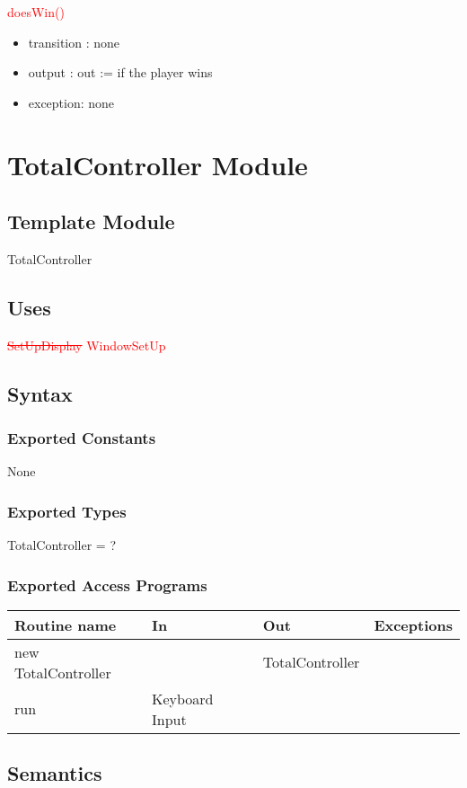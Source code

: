 \documentclass[12pt]{article}
\begin{document}
\noindent \textcolor{red}{doesWin()}
\begin{itemize}
\item transition : none
\item output : out := if the player wins
\item exception: none
\end{itemize}
\newpage

\section{TotalController Module}

\subsection*{Template Module}
TotalController

\subsection*{Uses}
\textcolor{red}{\st{SetUpDisplay} WindowSetUp}

\subsection*{Syntax}
\subsubsection*{Exported Constants}
None
\subsubsection*{Exported Types}
TotalController = ?
\subsubsection*{Exported Access Programs}
\begin{tabular}{| l | l | l | p{5cm} |}
\hline
\textbf{Routine name} & \textbf{In} & \textbf{Out} & \textbf{Exceptions}\\
\hline
new TotalController &  & TotalController & \\
\hline
run & Keyboard Input &  & \\
\hline
\end{tabular}

\subsection*{Semantics}
\end{document}
